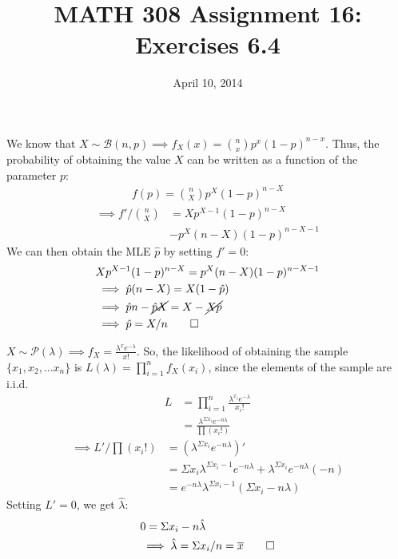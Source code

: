 \documentclass[twocolumn]{article}
\title{MATH 308 Assignment 16:\\Exercises 6.4}
\date{April 10, 2014}
\newcommand{\phat}{\ensuremath{\hat{p}}}
\newcommand{\lhat}{\hat{\lambda}}
\begin{document}
\maketitle

We know that $X\sim\mathcal{B}(n,p)\implies f_X(x)=\binom{n}{x}p^x(1-p)^{n-x}$. Thus, the probability of obtaining the value $X$ can be written as a function of the parameter $p$:
\begin{align*}
f(p)=\binom{n}{X}p^X(1-p)^{n-X}
\end{align*}
\begin{align*}
\implies f'/\binom{n}{X}&=Xp^{X-1}(1-p)^{n-X}\\
&-p^X(n-X)(1-p)^{n-X-1}
\end{align*}
We can then obtain the MLE \phat{} by setting $f'=0$:\begin{align*}
&Xp^{X-1}(1-p)^{n-X}=p^X(n-X)(1-p)^{n-X-1}\\
&\implies \phat(n-X)=X(1-\phat)\\
&\implies \phat n-\cancel{\phat X}=X-\cancel{X\phat}\\
&\implies \phat=X/n \qed
\end{align*}

$X\sim\mathcal{P}(\lambda)\implies f_X=\frac{\lambda^xe^{-\lambda}}{x!}$. So, the likelihood of obtaining the sample $\{x_1,x_2,\ldots x_n\}$ is $L(\lambda)=\prod_{i=1}^nf_X(x_i)$, since the elements of the sample are i.i.d.\begin{align*}
L&=\prod_{i=1}^n\frac{\lambda^{x_i}e^{-\lambda}}{x_i!}\\
&=\frac{\lambda^{\Sigma x_i}e^{-n\lambda}}{\prod (x_i!)}
\end{align*}
\begin{align*}
\implies L'/\prod (x_i!)&= \left(\lambda^{\Sigma x_i}e^{-n\lambda}\right)'\\
&= \Sigma x_i \lambda^{\Sigma x_i-1} e^{-n\lambda}
+ \lambda^{\Sigma x_i}e^{-n\lambda}(-n)\\
&=e^{-n\lambda}\lambda^{\Sigma x_i-1}\left( \Sigma x_i - n\lambda \right)
\end{align*}
Setting $L'=0$, we get $\lhat$:\begin{align*}
&0=\Sigma x_i - n\lhat\\
&\implies\lhat= \Sigma x_i/n = \overline{x}\qed
\end{align*}
\end{document}
